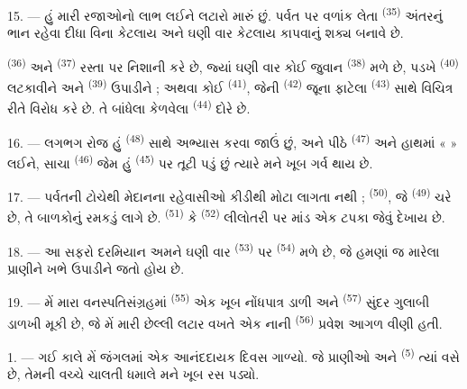 15. --- હું મારી રજાઓનો લાભ લઈને  લટારો મારું છું.
પર્વત પર વળાંક લેતા  \textsuperscript{(35)} અંતરનું ભાન
રહેવા દીધા વિના કેટલાય  અને ઘણી વાર કેટલાય
 કાપવાનું શક્ય બનાવે છે.

 \textsuperscript{(36)} અને  \textsuperscript{(37)} રસ્તા પર નિશાની કરે છે, જ્યાં ઘણી વાર
કોઈ જુવાન  \textsuperscript{(38)} મળે છે, પડખે
 \textsuperscript{(40)} લટકાવીને અને 
\textsuperscript{(39)} ઉપાડીને ; અથવા કોઈ 
\textsuperscript{(41)}, જેની 
\textsuperscript{(42)} જૂના ફાટેલા  \textsuperscript{(43)}
સાથે વિચિત્ર રીતે વિરોધ કરે છે. તે  બાંધેલા કેળવેલા
 \textsuperscript{(44)} દોરે છે.

\VUsaut{3.0mm}

16. --- લગભગ રોજ હું  \textsuperscript{(48)} સાથે
 અભ્યાસ કરવા જાઉં છું, અને પીઠે 
\textsuperscript{(47)} અને હાથમાં «  » લઈને, સાચા
 \textsuperscript{(46)} જેમ હું 
\textsuperscript{(45)} પર તૂટી પડું છું ત્યારે મને ખૂબ ગર્વ થાય છે.

17. --- પર્વતની ટોચેથી મેદાનના રહેવાસીઓ કીડીથી મોટા લાગતા નથી ;
 \textsuperscript{(50)}, જે 
\textsuperscript{(49)} ચરે છે, તે બાળકોનું રમકડું લાગે છે.
 \textsuperscript{(51)} કે 
\textsuperscript{(52)} લીલોતરી પર માંડ એક ટપકા જેવું દેખાય છે.

18. --- આ સફરો દરમિયાન અમને ઘણી વાર  \textsuperscript{(53)}
પર  \textsuperscript{(54)} મળે છે, જે હમણાં જ
મારેલા પ્રાણીને ખભે ઉપાડીને જતો હોય છે.

19. --- મેં મારા વનસ્પતિસંગ્રહમાં  \textsuperscript{(55)}
એક ખૂબ નોંધપાત્ર ડાળી અને  \textsuperscript{(57)} સુંદર
ગુલાબી ડાળખી મૂકી છે, જે મેં મારી છેલ્લી લટાર વખતે એક નાની
 \textsuperscript{(56)} પ્રવેશ આગળ વીણી હતી.

\VUsaut{3.0mm}
\VUsaut{3.0mm}

\VUsaut{3.0mm}

1. --- ગઈ કાલે મેં જંગલમાં એક આનંદદાયક દિવસ ગાળ્યો. જે પ્રાણીઓ અને
 \textsuperscript{(5)} ત્યાં વસે છે, તેમની વચ્ચે ચાલતી
ધમાલે મને ખૂબ રસ પડ્યો.

